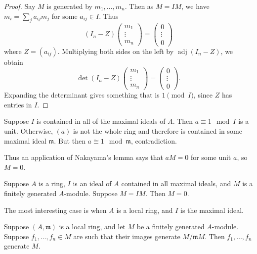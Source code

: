 \documentclass[12pt]{article}
\begin{document}
\begin{proof}
    Say $M$ is generated by $m_1, \ldots, m_n$. Then as $M = IM$, we have $m_i = \sum_j a_{ij} m_j$ for some $a_{ij} \in I$. Thus
    \[
        (I_n - Z) \begin{pmatrix} m_1 \\ \vdots \\ m_n \end{pmatrix} = \begin{pmatrix} 0 \\ \vdots \\ 0 \end{pmatrix}
    \]
    where $Z = (a_{ij})$. Multiplying both sides on the left by $\operatorname{adj}(I_n - Z)$, we obtain
    \[
        \det(I_n - Z) \begin{pmatrix} m_1 \\ \vdots \\ m_n \end{pmatrix} = \begin{pmatrix} 0 \\ \vdots \\ 0 \end{pmatrix}.
    \]
    Expanding the determinant gives something that is $1 \pmod{I}$, since $Z$ has entries in $I$.
\end{proof}

Suppose $I$ is contained in all of the maximal ideals of $A$. Then $a \equiv 1 \mod I$ is a unit. Otherwise, $(a)$ is not the whole ring and therefore is contained in some maximal ideal $\mathfrak m$. But then $a\cong 1\mod \mathfrak m$, contradiction.

Thus an application of Nakayama's lemma says that $aM = 0$ for some unit $a$, so $M=0$.

\begin{lemma}
    Suppose $A$ is a ring, $I$ is an ideal of $A$ contained in all maximal ideals, and $M$ is a finitely generated $A$-module. Suppose $M = IM$. Then $M = 0$.
\end{lemma}
The most interesting case is when $A$ is a local ring, and $I$ is the maximal ideal.

\begin{exercise}
    Suppose $(A,\mathfrak m)$ is a local ring, and let $M$ be a finitely generated $A$-module. Suppose $f_1,\dots,f_n \in M$ are such that their images generate $M/\mathfrak m M$. Then $f_1,\dots,f_n$ generate $M$.
\end{exercise}
\end{document}
